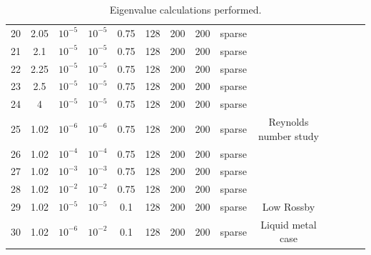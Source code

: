 \documentclass[openacc]{rsproca_new}%
\begin{document}
\begin{table}
\begin{tabular}{cccccccccccccc}
20 & 2.05   & $10^{-5}$ & $10^{-5}$ & 0.75 & 128 & 200 & 200 & sparse & \\
21 & 2.1    & $10^{-5}$ & $10^{-5}$ & 0.75 & 128 & 200 & 200 & sparse & \\
22 & 2.25   & $10^{-5}$ & $10^{-5}$ & 0.75 & 128 & 200 & 200 & sparse & \\
23 & 2.5    & $10^{-5}$ & $10^{-5}$ & 0.75 & 128 & 200 & 200 & sparse & \\
24 & 4      & $10^{-5}$ & $10^{-5}$ & 0.75 & 128 & 200 & 200 & sparse & \\
25 & 1.02   & $10^{-6}$ & $10^{-6}$ & 0.75 & 128 & 200 & 200 & sparse & Reynolds number study\\
26 & 1.02   & $10^{-4}$ & $10^{-4}$ & 0.75 & 128 & 200 & 200 & sparse & \\
27 & 1.02   & $10^{-3}$ & $10^{-3}$ & 0.75 & 128 & 200 & 200 & sparse & \\
28 & 1.02   & $10^{-2}$ & $10^{-2}$ & 0.75 & 128 & 200 & 200 & sparse & \\
29 & 1.02   & $10^{-5}$ & $10^{-5}$ & 0.1  & 128 & 200 & 200 & sparse & Low Rossby\\ 
30 & 1.02   & $10^{-6}$ & $10^{-2}$ & 0.1  & 128 & 200 & 200 & sparse & Liquid metal case\\ 
\end{tabular}
\caption{Eigenvalue calculations performed.}
\label{tab:runs}
\end{table}
\end{document}
